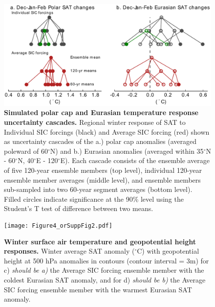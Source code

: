 \documentclass{nature}
\begin{document}
\begin{figure}%
\centering
\noindent\includegraphics[width=35pc]{Figure3.pdf}
\caption{\textbf{Simulated polar cap and Eurasian temperature response uncertainty cascades.} Regional winter response of SAT to Individual SIC forcings (black) and Average SIC forcing (red) shown as uncertainty cascades of the a.) polar cap anomalies (averaged poleward of 60$^\circ$N) and b.) Eurasian anomalies (averaged within 35$^\circ$N - 60$^\circ$N, 40$^\circ$E - 120$^\circ$E). Each cascade consists of the ensemble average of five 120-year ensemble members (top level), individual 120-year ensemble member averages (middle level), and ensemble members sub-sampled into two 60-year segment averages (bottom level). Filled circles indicate significance at the 90\% level using the Student’s T test of difference between two means. 
}
\label{fig:fig3} 
\end{figure}

\begin{figure}%
\centering
\noindent\texttt{[image: Figure4\_orSuppFig2.pdf]}
\caption{\textbf{Winter surface air temperature and geopotential height responses.} Winter average SAT anomaly ($^\circ$C) with geopotential height at 500 hPa anomalies in contours (contour interval = 3m) for c) \textit{should be a)} the Average SIC forcing ensemble member with the coldest Eurasian SAT anomaly, and for d) \textit{should be b)} the Average SIC forcing ensemble member with the warmest Eurasian SAT anomaly.
}
\label{fig:fig4} 
\end{figure}
\end{document}

